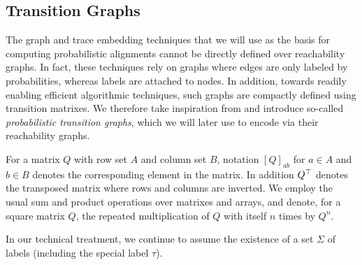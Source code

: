 %
%



\subsection{Transition Graphs}\label{subsec:ppn}

The graph and trace embedding techniques that we will use as the basis for computing probabilistic alignments cannot be directly defined over reachability graphs. In fact, these techniques rely on graphs where edges are only labeled by probabilities, whereas labels are attached to nodes. In addition, towards readily enabling     efficient algorithmic techniques, such graphs are compactly defined using transition matrixes. We therefore take inspiration from \cite{GartnerFW03} and introduce so-called \emph{probabilistic transition graphs}, which we will later use to encode  via their reachability graphs.

For a matrix $Q$ with row set $A$ and column set $B$, notation $[Q]_{ab}$ for $a \in A$ and $b \in B$ denotes the corresponding element in the matrix. In addition $Q^\top$ denotes the transposed matrix where rows and columns are inverted. We employ the usual sum and product operations over matrixes and arrays, and denote, for a square matrix $Q$, the repeated multiplication of $Q$ with itself $n$ times by $Q^n$.

In our technical treatment, we continue to assume the existence of a set $\Sigma$ of labels (including the special label $\tau$).

